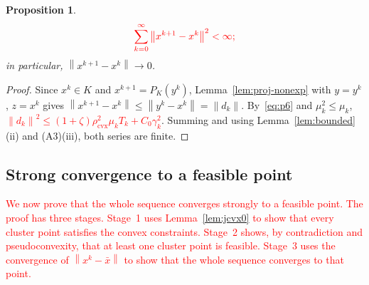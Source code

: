 \documentclass[]{interact}
\theoremstyle{plain}
\newtheorem{proposition}[theorem]{Proposition}
\theoremstyle{definition}
\theoremstyle{remark}
\newcommand{\norm}[1]{\left\lVert #1 \right\rVert}
\newcommand{\cvx}{\mathrm{cvx}}
\begin{document}
\begin{proposition}\label{prop:regularity}
\[\textcolor{red}{
\sum_{k=0}^{\infty}\norm{x^{k+1}-x^k}^{2}<\infty;
}\]
in particular,
$\norm{x^{k+1}-x^k}\to0$.
\end{proposition}
\begin{proof}
Since $x^k\in K$ and $x^{k+1}=P_K(y^k)$, Lemma~\ref{lem:proj-nonexp} with $y=y^k$, $z=x^k$
gives $\norm{x^{k+1}-x^k}\le\norm{y^k-x^k}=\norm{d_k}$. By~\eqref{eq:p6} and
$\mu_k^2\le\mu_k$, \leavevmode\textcolor{red}{$\norm{d_k}^2\le(1+\zeta)\rho_{\cvx}^2\mu_k T_k+C_0\gamma_k^2$}.
Summing and using Lemma~\ref{lem:bounded}(ii) and (A3)(iii), both series are finite.
\end{proof}

\subsection{Strong convergence to a feasible point}\label{ssec:strong}
\leavevmode\textcolor{red}{We now prove that the whole sequence converges strongly to a feasible point. The proof has three
stages. Stage~1 uses Lemma~\ref{lem:jcvx0} to show that every cluster point satisfies the
convex constraints. Stage~2 shows, by contradiction and pseudoconvexity, that at least one
cluster point is feasible. Stage~3 uses the convergence of $\norm{x^k-\bar x}$ to show that
the whole sequence converges to that point.}
\end{document}
